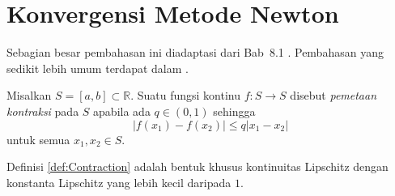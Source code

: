 \section{Konvergensi Metode Newton}
\begin{remark} Sebagian besar pembahasan ini diadaptasi dari Bab~8.1 \cite{Av03}. Pembahasan yang sedikit lebih umum terdapat dalam \cite{BHS06}.
\end{remark}

\begin{definition} Misalkan $S=[a,b]\subset\mathbb{R}$. Suatu fungsi kontinu $f:S\rightarrow S$ disebut \textit{pemetaan kontraksi} pada $S$ apabila ada $q\in(0,1)$ sehingga
\label{def:Contraction}
\begin{equation}
|f(x_1)-f(x_2)|\leq q|x_1-x_2|
\end{equation}
untuk semua $x_1,x_2\in S$.
\end{definition}

\begin{remark} Definisi \ref{def:Contraction} adalah bentuk khusus kontinuitas Lipschitz dengan konstanta Lipschitz yang lebih kecil daripada $1$.
\end{remark}

